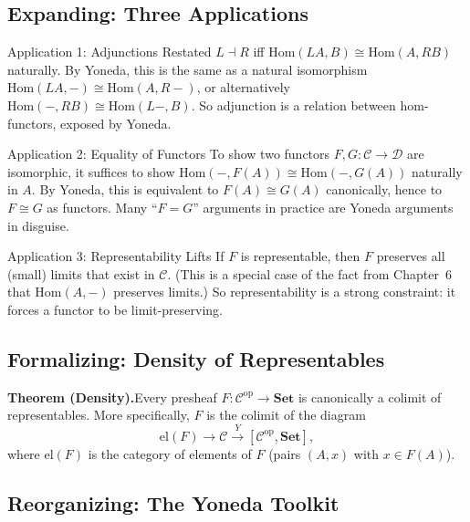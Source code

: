 \subsection{Expanding: Three Applications}

\begin{example}{Application 1: Adjunctions Restated}
$L \dashv R$ iff $\mathrm{Hom}(L A, B) \cong \mathrm{Hom}(A, R B)$
naturally. By Yoneda, this is the same as a natural isomorphism
$\mathrm{Hom}(L A, -) \cong \mathrm{Hom}(A, R -)$, or alternatively
$\mathrm{Hom}(-, R B) \cong \mathrm{Hom}(L -, B)$. So adjunction is a
relation between hom-functors, exposed by Yoneda.
\end{example}

\begin{example}{Application 2: Equality of Functors}
To show two functors $F, G : \mathcal{C} \to \mathcal{D}$ are isomorphic,
it suffices to show $\mathrm{Hom}(-, F(A)) \cong \mathrm{Hom}(-, G(A))$
naturally in $A$. By Yoneda, this is equivalent to $F(A) \cong G(A)$
canonically, hence to $F \cong G$ as functors. Many ``$F = G$'' arguments
in practice are Yoneda arguments in disguise.
\end{example}

\begin{example}{Application 3: Representability Lifts}
If $F$ is representable, then $F$ preserves all (small) limits that exist
in $\mathcal{C}$. (This is a special case of the fact from Chapter~6 that
$\mathrm{Hom}(A, -)$ preserves limits.) So representability is a strong
constraint: it forces a functor to be limit-preserving.
\end{example}

\subsection{Formalizing: Density of Representables}

\textbf{Theorem (Density).}\quad Every presheaf $F : \mathcal{C}^{\mathrm{op}}
\to \mathbf{Set}$ is canonically a colimit of representables. More
specifically, $F$ is the colimit of the diagram
\begin{equation*}
  \mathrm{el}(F) \to \mathcal{C} \xrightarrow{\mathit{Y}}
  [\mathcal{C}^{\mathrm{op}}, \mathbf{Set}],
\end{equation*}
where $\mathrm{el}(F)$ is the category of elements of $F$ (pairs $(A, x)$
with $x \in F(A)$).

\subsection{Reorganizing: The Yoneda Toolkit}

